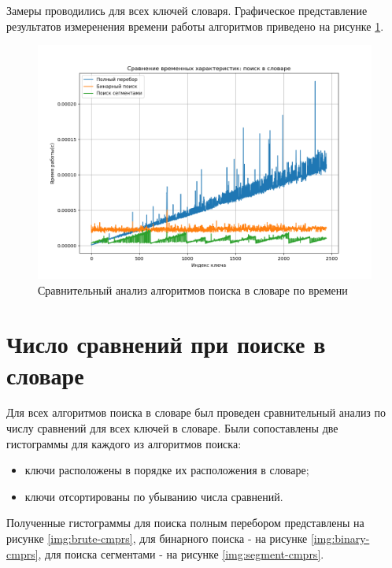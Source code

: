 Замеры проводились для всех ключей словаря. Графическое представление результатов измеренения времени работы алгоритмов приведено на рисунке \ref{img:time}.

\begin{figure}[H]
	\begin{center}
		\includegraphics[scale=0.5]{img/time.png}
	\end{center}
	\captionsetup{justification=centering}
	\caption{Сравнительный анализ алгоритмов поиска в словаре по времени}
	\label{img:time}
\end{figure}

\section{Число сравнений при поиске в словаре}

Для всех алгоритмов поиска в словаре был проведен сравнительный анализ по числу сравнений для всех ключей в словаре. Были сопоставлены две гистограммы для каждого из алгоритмов поиска:

\begin{itemize}
	\item ключи расположены в порядке их расположения в словаре;
	\item ключи отсортированы по убыванию числа сравнений.
\end{itemize}

Полученные гистограммы для поиска полным перебором представлены на рисунке \ref{img:brute-cmprs}, для бинарного поиска - на рисунке \ref{img:binary-cmprs}, для поиска сегментами - на рисунке \ref{img:segment-cmprs}.

